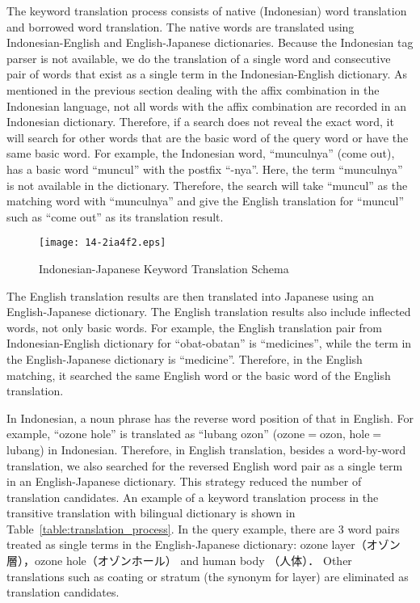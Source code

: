 \documentclass[english]{jnlp_1.3c}
\begin{document}
The keyword translation process consists of native (Indonesian) word 
translation and borrowed word translation. The native words are 
translated using Indonesian-English and English-Japanese dictionaries. 
Because the Indonesian tag parser is not available, we do the 
translation of a single word and consecutive
pair of words that exist as a single term in the Indonesian-English
dictionary. As mentioned in the previous section dealing with the affix
combination in the Indonesian language, not all words with the affix
combination are recorded in an Indonesian dictionary. Therefore, if a
search does not reveal the exact word, it will search for other words
that are the basic word of the query word or have the same basic
word. For example, the Indonesian word, ``munculnya'' (come out), has a
basic word ``muncul'' with the postfix ``-nya''. Here, the term
``munculnya'' is not available in the dictionary. Therefore, the search
will take ``muncul'' as the matching word with ``munculnya'' and give
the English translation for ``muncul'' such as ``come out'' as its
translation result.

\begin{figure}[t]
  \begin{center}
        \texttt{[image: 14-2ia4f2.eps]}
  \end{center}
  \caption{Indonesian-Japanese Keyword Translation Schema}
  \label{fig:keyword_translation}
\end{figure}

The English translation results are then translated into Japanese using
an English-Japanese dictionary. The English translation results also
include inflected words, not only basic words. For example, the English
translation pair from Indonesian-English dictionary for ``obat-obatan''
is ``medicines'', while the term in the English-Japanese dictionary is
``medicine''. Therefore, in the English matching, it searched the same
English word or the basic word of the English translation.  

In Indonesian, a noun phrase has the reverse word position of that in
English. For example, ``ozone hole'' is translated as ``lubang ozon''
(ozone$=$ozon, hole$=$lubang) in Indonesian. Therefore, in English
translation, besides a word-by-word translation, we also searched for
the reversed English word pair as a single term in an English-Japanese
dictionary. This strategy reduced the number of translation
candidates. An example of a keyword translation process in the
transitive translation with bilingual dictionary is shown in
Table~\ref{table:translation_process}. In the query example, there are 3
word pairs treated as single terms in the English-Japanese dictionary:
ozone layer（オゾン層），ozone hole（オゾンホール） and human body （人体）．
Other translations such as coating or stratum (the synonym for layer)
are eliminated as translation candidates.
\end{document}
